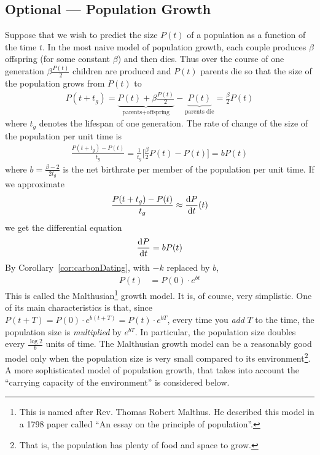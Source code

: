 \subsection{Optional --- Population Growth}

Suppose that we wish to predict the size $P(t)$ of a
population as a function of the time $t$.
In the most naive model of population growth,  each couple produces
$\beta$ offspring (for some constant $\beta$) and then dies. Thus
over the course of one generation $\beta\tfrac{P(t)}{2}$ children are
produced and $P(t)$ parents die so that the size of the population grows
from  $P(t)$ to
\begin{align*}
  P(t+t_g)=
    \underbrace{P(t)
  +\beta\frac{P(t)}{2}}_{\text{parents+offspring}}
    -\underbrace{P(t)}_{\text{parents die}}
   =\frac{\beta}{ 2 } P(t)
\end{align*}
where $t_g$ denotes the lifespan of one generation. The rate of change
of the size of the population per unit time is
\begin{align*}
  \frac{P(t+t_g)-P(t)}{t_g}
  =\frac{1}{t_g}\Big[\frac{\beta}{2}P(t) -P(t)\Big]
  = b P(t)
\end{align*}
where $ b=\tfrac{\beta-2}{2t_g}$ is the net birthrate per member
of the population per unit time. If we approximate
\begin{align*}
\frac{P(t+t_g)-P(t)}{t_g}\approx\diff{P}{t}(t)
\end{align*}
we get the differential equation
\begin{align}\label{eqn:Malthus}
  \diff{P}{t} = bP(t)
\end{align}
By Corollary~\ref{cor:carbonDating}, with $-k$ replaced by $b$,
\begin{align}\label{eqn:MalthusSln}
P(t) &= P(0)\cdot e^{bt}
\end{align}
This is called the Malthusian\footnote{This is named after Rev. Thomas
Robert Malthus. He described this model in a 1798 paper called ``An essay on
the principle of population''.} growth model. It is, of course, very
simplistic. One of its main characteristics is that, since
$P(t+T) = P(0)\cdot e^{b(t+T)} = P(t)\cdot e^{bT}$, every time
you \emph{add} $T$ to the time, the population size is
\emph{multiplied} by $e^{bT}$. In particular, the population
size doubles every $\frac{\log 2}{b}$ units of time.
The Malthusian growth model can be a reasonably good model
only when the population size is very small compared to its
environment\footnote{That is, the population has plenty of food
and space to grow.}. A more sophisticated model of population
growth, that takes into account the ``carrying capacity of the environment''
is considered below.

